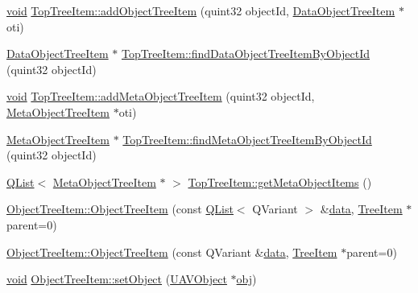 \begin{DoxyCompactItemize}
\item 
\hyperlink{group___u_a_v_objects_plugin_ga444cf2ff3f0ecbe028adce838d373f5c}{void} \hyperlink{group___u_a_v_object_browser_plugin_ga0bf12ffb3c9062983ea24eb70eb04d10}{Top\-Tree\-Item\-::add\-Object\-Tree\-Item} (quint32 object\-Id, \hyperlink{class_data_object_tree_item}{Data\-Object\-Tree\-Item} $\ast$oti)
\item 
\hyperlink{class_data_object_tree_item}{Data\-Object\-Tree\-Item} $\ast$ \hyperlink{group___u_a_v_object_browser_plugin_ga75602e9fca2d0a49f5463712ac8b1d30}{Top\-Tree\-Item\-::find\-Data\-Object\-Tree\-Item\-By\-Object\-Id} (quint32 object\-Id)
\item 
\hyperlink{group___u_a_v_objects_plugin_ga444cf2ff3f0ecbe028adce838d373f5c}{void} \hyperlink{group___u_a_v_object_browser_plugin_gad58a2bd3f036f91b012a93876993bdff}{Top\-Tree\-Item\-::add\-Meta\-Object\-Tree\-Item} (quint32 object\-Id, \hyperlink{class_meta_object_tree_item}{Meta\-Object\-Tree\-Item} $\ast$oti)
\item 
\hyperlink{class_meta_object_tree_item}{Meta\-Object\-Tree\-Item} $\ast$ \hyperlink{group___u_a_v_object_browser_plugin_gaa9790dc57ee25280838c1828d5991f92}{Top\-Tree\-Item\-::find\-Meta\-Object\-Tree\-Item\-By\-Object\-Id} (quint32 object\-Id)
\item 
\hyperlink{class_q_list}{Q\-List}$<$ \hyperlink{class_meta_object_tree_item}{Meta\-Object\-Tree\-Item} $\ast$ $>$ \hyperlink{group___u_a_v_object_browser_plugin_gad60c68296e476007863dd24d950daf5e}{Top\-Tree\-Item\-::get\-Meta\-Object\-Items} ()
\item 
\hyperlink{group___u_a_v_object_browser_plugin_ga5e60cc8ad10984411923efa677042087}{Object\-Tree\-Item\-::\-Object\-Tree\-Item} (const \hyperlink{class_q_list}{Q\-List}$<$ Q\-Variant $>$ \&\hyperlink{glext_8h_a8850df0785e6fbcc2351af3b686b8c7a}{data}, \hyperlink{class_tree_item}{Tree\-Item} $\ast$parent=0)
\item 
\hyperlink{group___u_a_v_object_browser_plugin_gafad6566ac62ae971f53230a0ec190070}{Object\-Tree\-Item\-::\-Object\-Tree\-Item} (const Q\-Variant \&\hyperlink{glext_8h_a8850df0785e6fbcc2351af3b686b8c7a}{data}, \hyperlink{class_tree_item}{Tree\-Item} $\ast$parent=0)
\item 
\hyperlink{group___u_a_v_objects_plugin_ga444cf2ff3f0ecbe028adce838d373f5c}{void} \hyperlink{group___u_a_v_object_browser_plugin_ga5484d17e330931614680cfac5a1d1d3d}{Object\-Tree\-Item\-::set\-Object} (\hyperlink{class_u_a_v_object}{U\-A\-V\-Object} $\ast$\hyperlink{glext_8h_a0c0d4701a6c89f4f7f0640715d27ab26}{obj})

\end{DoxyCompactItemize}

